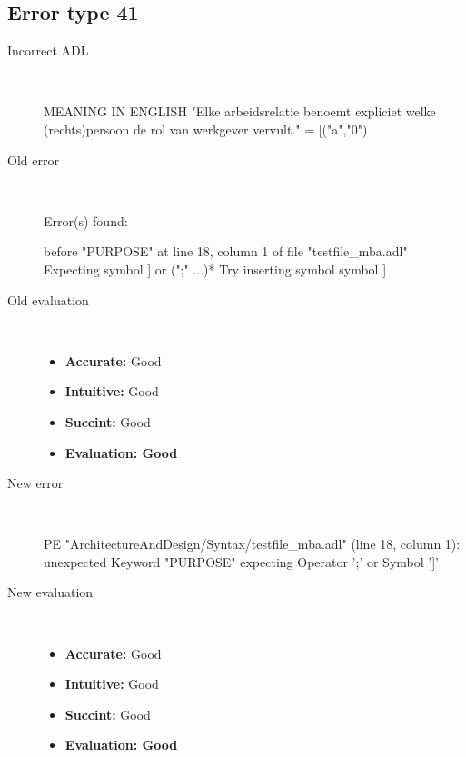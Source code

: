 \hrulefill

\subsection{Error type 41}
  \begin{description}
  \item[Incorrect ADL]~\\
\begin{adl}
MEANING IN ENGLISH "Elke arbeidsrelatie benoemt expliciet welke (rechts)persoon de rol van werkgever vervult."
= [("a","0")\end{adl}
  \item[Old error]~\\
\begin{haskell}
Error(s) found:

before "PURPOSE" at line 18, column 1 of file "testfile_mba.adl"
Expecting symbol ] or (";" ...)*
Try inserting symbol symbol ]

\end{haskell}
  \item[Old evaluation]~\\
    \begin{itemize}
    \item \textbf{Accurate:} Good
    \item \textbf{Intuitive:} Good
    \item \textbf{Succint:} Good
    \item \textbf{Evaluation: Good}
    \end{itemize}
  \item[New error]~\\
\begin{haskell}
PE "ArchitectureAndDesign/Syntax/testfile_mba.adl" (line 18, column 1):
unexpected Keyword "PURPOSE"
expecting Operator ';' or Symbol ']'\end{haskell}
  \item[New evaluation]~\\
    \begin{itemize}
    \item \textbf{Accurate:} Good
    \item \textbf{Intuitive:} Good
    \item \textbf{Succint:} Good
    \item \textbf{Evaluation: Good
}
    \end{itemize}
  \end{description}

\hrulefill

